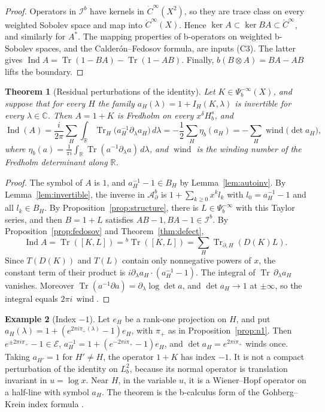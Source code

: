 \documentclass[11pt,oneside,reqno]{article}
\newcommand{\C}{\mathbb C}
\DeclareMathOperator{\Tr}{Tr}
\newcommand{\cE}{\mathcal E}
\newcommand{\Ib}{\mathcal I^b}
\newcommand{\Adb}{\mathcal A^b_\partial}
\theoremstyle{plain}
\newtheorem{theorem}{Theorem}[section]
\theoremstyle{definition}
\newtheorem{example}[theorem]{Example}
\theoremstyle{remark}
\begin{document}
\begin{proof}
Operators in \(\Ib\) have kernels in \(\dot C^\infty(X^2)\), so they are
trace class on every weighted Sobolev space and map into
\(\dot C^\infty(X)\). Hence \(\ker A\subset\ker BA\subset\dot C^\infty\),
and similarly for \(A^*\). The mapping properties of b-operators on
weighted b-Sobolev spaces, and the Calder\'on--Fedosov formula, are inputs
(C3). The latter gives
\(\operatorname{Ind}A=\Tr(1-BA)-\Tr(1-AB)\). Finally,
\(b(B\otimes A)=BA-AB\) lifts the boundary.
\end{proof}

\begin{theorem}[Residual perturbations of the identity]\label{thm:WH}
Let \(K\in\Psi_b^{-\infty}(X)\), and suppose that for every \(H\) the family
\(a_H(\lambda)=1+I_H(K,\lambda)\) is invertible for every \(\lambda\in\C\).
Then \(A=1+K\) is Fredholm on every
\(x^\delta H^s_b\), and
\[
 \operatorname{Ind}(A)
 =\frac{i}{2\pi}\sum_H\int_{\mathbb R}\Tr_H\bigl(a_H^{-1}\partial_\lambda a_H
 \bigr)\,d\lambda
 =-\frac12\sum_H\eta_b(a_H)
 =-\sum_H\operatorname{wind}\bigl(\det a_H\bigr),
\]
where \(\eta_b(a)=\frac1{\pi i}\int_{\mathbb R}\Tr(a^{-1}\partial_\lambda a)
\,d\lambda\), and \(\operatorname{wind}\) is the winding number of the
Fredholm determinant along \(\mathbb R\).
\end{theorem}

\begin{proof}
The symbol of \(A\) is \(1\), and \(a_H^{-1}-1\in B_H\) by
Lemma~\ref{lem:autoinv}. By Lemma~\ref{lem:invertible}, the inverse in
\(\Adb\) is \(1+\sum_{k\geq0}x^kl_k\) with \(l_0=a_H^{-1}-1\) and all
\(l_k\in B_H\). By Proposition~\ref{prop:structure}, there is
\(L\in\Psi_b^{-\infty}\) with this Taylor series, and then
\(B=1+L\) satisfies \(AB-1,BA-1\in\Ib\). By
Proposition~\ref{prop:fedosov} and Theorem~\ref{thm:defect},
\[
 \operatorname{Ind}A=\Tr([K,L])={}^b\Tr([K,L])
 =\sum_H\Tr_{\partial,H}(D(K)L).
\]
Since \(T(D(K))\) and \(T(L)\) contain only nonnegative powers of \(x\),
the constant term of their product is
\(i\partial_\lambda a_H\cdot(a_H^{-1}-1)\). The integral of
\(\Tr\,\partial_\lambda a_H\) vanishes. Moreover
\(\Tr(a^{-1}\partial a)=\partial_\lambda\log\det a\), and
\(\det a_H\to1\) at \(\pm\infty\), so the integral equals
\(2\pi i\,\operatorname{wind}\).
\end{proof}

\begin{example}[Index \(-1\)]\label{ex:WH}
Let \(e_H\) be a rank-one projection on \(H\), and put
\(a_H(\lambda)=1+(e^{2\pi i\pi_+(\lambda)}-1)e_H\), with \(\pi_+\) as in
Proposition~\ref{prop:n1}. Then \(e^{\pm2\pi i\pi_+}-1\in\cE\),
\(a_H^{-1}=1+(e^{-2\pi i\pi_+}-1)e_H\), and \(\det a_H=e^{2\pi i\pi_+}\) winds
once. Taking \(a_{H'}=1\) for \(H'\neq H\), the operator \(1+K\) has index
\(-1\). It is not a compact perturbation of the identity on \(L^2_b\),
because its normal operator is translation invariant in \(u=\log x\). Near
\(H\), in the variable \(u\), it is a Wiener--Hopf operator on a half-line
with symbol \(a_H\). The theorem is the b-calculus form of the
Gohberg--Krein index formula \cite{GohbergKrein}.
\end{example}
\end{document}
